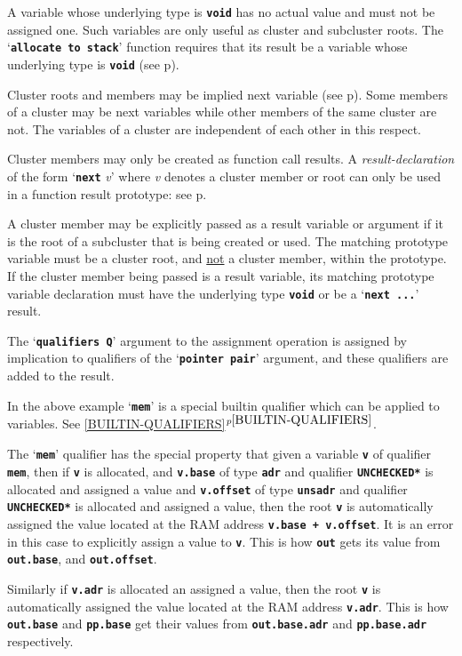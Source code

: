 \documentclass[12pt]{article}
\newcommand{\TT}[1]{{\tt \bfseries #1}}
\newcommand{\itemref}[1]{\ref{#1}$^{p\pageref{#1}}$}
\newcommand{\pagref}[1]{p\pageref{#1}}
\begin{document}
A variable whose underlying type is \TT{void} has no actual value
and must not be assigned one.  Such variables are only useful
as cluster and subcluster roots.  The `\TT{allocate to stack}'
function requires that its result be a variable whose underlying
type is \TT{void} (see \pagref{ALLOCATE-TO-STACK}).

Cluster roots and members may be implied next variable
(see \pagref{IMPLIED-NEXT-VARIABLES}).  Some members of a cluster
may be next variables while other members of the same cluster are
not.  The variables of a cluster are independent of each other
in this respect.

Cluster members may only be created as function call results.
A {\em result-declaration} of the form `\TT{next} {\em v}' where
{\em v} denotes a cluster member or root can only be used in
a function result prototype: 
see \pagref{IMPLIED-NEXT-VARIABLES}.

A cluster member may be explicitly passed as a result variable
or argument if it is the root of a subcluster that is being
created or used.  The matching prototype variable must
be a cluster root, and \underline{not} a cluster member,
within the prototype.  If the cluster member being passed is a
result variable, its matching prototype variable declaration must have the
underlying type \TT{void} or be a `\TT{next ...}' result.

The `\TT{qualifiers Q}' argument to the assignment operation
is assigned by implication to qualifiers of the `\TT{pointer pair}'
argument, and these qualifiers are added to the result.

In the above example `\TT{mem}' is a special builtin qualifier
which can be applied to variables.
See \itemref{BUILTIN-QUALIFIERS}.

The `\TT{mem}' qualifier\label{MEM}
has the special property that given a variable
\TT{v} of qualifier \TT{mem}, then if \TT{v} is allocated,
and \TT{v.base} of type \TT{adr} and qualifier \TT{*UNCHECKED*}
is allocated and assigned a value
and \TT{v.offset} of type \TT{unsadr} and qualifier \TT{*UNCHECKED*}
is allocated and assigned a value, then
the root \TT{v} is automatically
assigned the value located at the RAM address \TT{v.base + v.offset}.
It is an error in this case to explicitly assign a value to \TT{v}.
This is how \TT{out} gets its value from
\TT{out.base}, and \TT{out.offset}.

Similarly if \TT{v.adr} is allocated an assigned a value, then
the root \TT{v} is automatically
assigned the value located at the RAM address \TT{v.adr}.
This is how \TT{out.base} and \TT{pp.base} get their values from
\TT{out.base.adr} and \TT{pp.base.adr} respectively.
\end{document}
